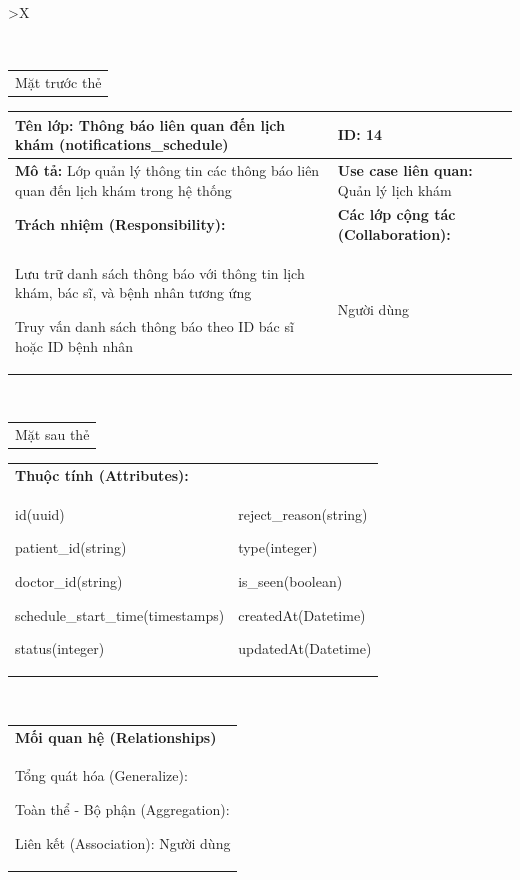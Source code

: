 \begin{xltabular}{\textwidth}{
		>{\centering\arraybackslash}X
	}
	\caption{\bfseries \fontsize{12pt}{0pt}\selectfont Thẻ CRC lớp Thông báo liên quan đến lịch khám}
	\\
	\begin{tabularx}{0.9\textwidth}{X}
		Mặt trước thẻ
	\end{tabularx}
	\begin{tabularx}{0.9\textwidth}{|X|X|}
		\hline
		\textbf{Tên lớp:} Thông báo liên quan đến lịch khám (notifications\_schedule)              & \textbf{ID:} 14                                 \\
		\hline
		\textbf{Mô tả:} Lớp quản lý thông tin các thông báo liên quan đến lịch khám trong hệ thống & \textbf{Use case liên quan:}  Quản lý lịch khám \\
		\hline
		\textbf{Trách nhiệm (Responsibility):}                                                     & \textbf{Các lớp cộng tác (Collaboration):}      \\
		Lưu trữ danh sách thông báo với thông tin lịch khám, bác sĩ, và bệnh nhân tương ứng

		Truy vấn danh sách thông báo theo ID bác sĩ hoặc ID bệnh nhân
		                                                                                           &
		Người dùng
		\\
		\hline
	\end{tabularx}
	\\
	\begin{tabularx}{0.9\textwidth}{X}
		Mặt sau thẻ
	\end{tabularx}
	\begin{tabularx}{0.9\textwidth}{|X|X|}
		\hline
		\textbf{Thuộc tính (Attributes):} & \\
		id(uuid)

		patient\_id(string)

		doctor\_id(string)

		schedule\_start\_time(timestamps)

		status(integer)
		                                  &
		reject\_reason(string)

		type(integer)

		is\_seen(boolean)

		createdAt(Datetime)

		updatedAt(Datetime)
		\\ \hline
	\end{tabularx}
	\\
	\begin{tabularx}{0.9\textwidth}{|X|}
		\hline
		\textbf{Mối quan hệ (Relationships)} \\
		Tổng quát hóa (Generalize):

		Toàn thể - Bộ phận (Aggregation):

		Liên kết (Association): Người dùng
		\\
		\hline
	\end{tabularx}
\end{xltabular}

